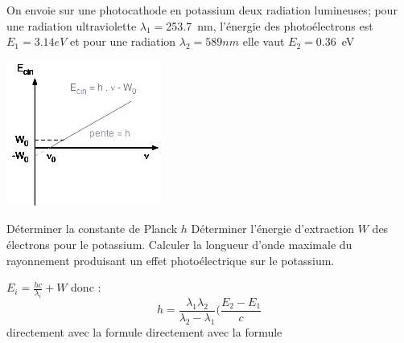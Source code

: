 \begin{Exercise}[title=Effet photoélectrique]
  On envoie sur une photocathode en potassium deux radiation lumineuses; pour une
  radiation ultraviolette $\lambda_1=$\SI{253.7}{nm}, l'énergie des photoélectrons est
  $E_1=3.14eV$ et pour une radiation $\lambda_2=589 nm$ elle vaut $E_2=$\SI{0.36}{eV}
  \begin{center}
    \includegraphics[scale=0.8]{./fig/photoel.jpg}
  \end{center}
  \Question Déterminer la constante de Planck $h$
  \Question Déterminer l'énergie d'extraction $W$ des électrons pour le potassium.
  \Question Calculer la longueur d'onde maximale du rayonnement produisant un
  effet photoélectrique sur le potassium.
\end{Exercise}
\begin{Answer}
  \Question  $E_i= \frac{hc}{\lambda_i}+W$ donc :
  \[h= \frac{\lambda_1\lambda_2}{\lambda_2-\lambda_1}(\frac{E_2-E_1}{c}\]
  \Question directement avec la formule
  \Question directement avec la formule
\end{Answer}
